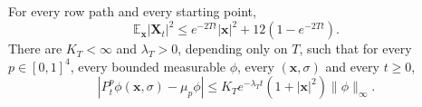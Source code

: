 \begin{lemma}\label{lem:sel_harris}
For every row path and every starting point,
\begin{equation}
\mathbb E_{\mathbf x}|\mathbf X_t|^2\le e^{-2Tt}|\mathbf x|^2+12(1-e^{-2Tt}).
\label{eq:sel_moment}
\end{equation}
There are $K_T<\infty$ and $\lambda_T>0$, depending only on $T$, such that for every $p\in[0,1]^4$, every bounded measurable $\phi$, every $(\mathbf x,\sigma)$ and every $t\ge0$,
\begin{equation}
|P^p_t\phi(\mathbf x,\sigma)-\mu_p\phi|\le K_Te^{-\lambda_Tt}(1+|\mathbf x|^2)\|\phi\|_\infty.
\label{eq:sel_harris}
\end{equation}
\end{lemma}


